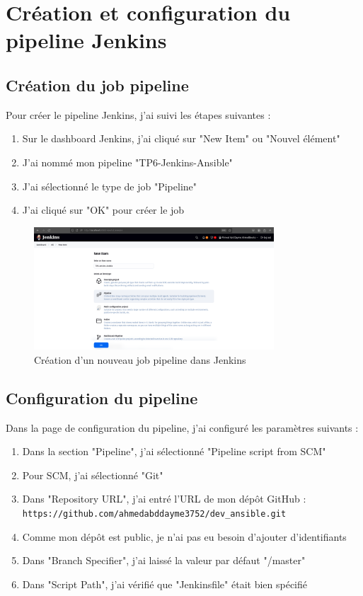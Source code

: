 \documentclass{article}
\begin{document}
\section{Création et configuration du pipeline Jenkins}
\subsection{Création du job pipeline}

Pour créer le pipeline Jenkins, j'ai suivi les étapes suivantes :
\begin{enumerate}
    \item Sur le dashboard Jenkins, j'ai cliqué sur "New Item" ou "Nouvel élément"
    \item J'ai nommé mon pipeline "TP6-Jenkins-Ansible"
    \item J'ai sélectionné le type de job "Pipeline"
    \item J'ai cliqué sur "OK" pour créer le job
\end{enumerate}

\begin{figure}[h]
    \centering
    \includegraphics[width=0.8\textwidth]{images/jenkins_newitem.png}
    \caption{Création d'un nouveau job pipeline dans Jenkins}
    \label{fig:jenkins_newitem}
\end{figure}

\subsection{Configuration du pipeline}

Dans la page de configuration du pipeline, j'ai configuré les paramètres suivants :
\begin{enumerate}
    \item Dans la section "Pipeline", j'ai sélectionné "Pipeline script from SCM"
    \item Pour SCM, j'ai sélectionné "Git"
    \item Dans "Repository URL", j'ai entré l'URL de mon dépôt GitHub : \\
    \texttt{https://github.com/ahmedabddayme3752/dev\_ansible.git}
    \item Comme mon dépôt est public, je n'ai pas eu besoin d'ajouter d'identifiants
    \item Dans "Branch Specifier", j'ai laissé la valeur par défaut "\*/master"
    \item Dans "Script Path", j'ai vérifié que "Jenkinsfile" était bien spécifié
\end{enumerate}
\end{document}
